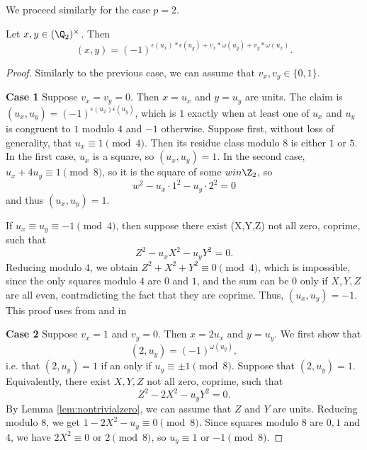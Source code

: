 We proceed similarly for the case $p = 2$.

\begin{theorem}
	\label{thm:padic_2}
	\leanok
Let $x,y \in (\Q_2)^\times$. Then
\[(x,y) = (-1)^{\epsilon(u_x)*\epsilon(u_y) + v_x * \omega(u_y) + v_y * \omega(u_x)}.\]
\end{theorem}

\begin{proof}
	Similarly to the previous case, we can assume that $v_x, v_y \in \{0, 1\}$.

	\noindent\textbf{Case 1} Suppose $v_x=v_y=0$. Then $x=u_x$ and $y=u_y$ are units. The claim is
		$(u_x,u_y)=(-1)^{\epsilon(u_x)\epsilon(u_y)}$, which is $1$ exactly when at least one of $u_x$
		and $u_y$ is congruent to $1$ modulo $4$ and $-1$ otherwise.
		Suppose first, without loss of generality, that $u_x \equiv 1 \pmod 4$. Then its residue class
		modulo $8$ is either $1$ or $5$. In the first case, $u_x$ is a square, so $(u_x,u_y)=1$. In the
		second case, $u_x+4u_y \equiv 1 \pmod 8$, so it is the square of some $w in \Z_2$, so
		\[
		w^2-u_x\cdot 1^2- u_y\cdot 2^2 = 0
		\]
		and thus $(u_x,u_y)=1$.

		If $u_x \equiv u_y \equiv -1 \pmod 4$, then suppose there exist (X,Y,Z) not all zero, coprime,
		such that
		\[
		Z^2-u_xX^2-u_yY^2=0.
		\]
		Reducing modulo $4$, we obtain $Z^2+X^2+Y^2 \equiv 0 \pmod 4$, which is impossible, since the
		only squares modulo $4$ are $0$ and $1$, and the sum can be $0$ only if $X,Y,Z$ are all even,
		contradicting the fact that they are coprime. Thus, $(u_x,u_y)=-1$.
		This proof uses  from  and  in 

		\noindent\textbf{Case 2} Suppose $v_x=1$ and $v_y=0$. Then $x=2 u_x$ and $y=u_y$. We first show that
		\[
		(2, u_y) = (-1)^{\omega(u_y)},
		\]
		i.e. that $(2, u_y)=1$ if an only if $u_y \equiv \pm 1 \pmod 8$.
		Suppose that $(2, u_y)=1$. Equivalently, there exist $X,Y,Z$ not all zero, coprime, such that
		\[
		Z^2-2X^2-u_yY^2=0.
		\]
		By Lemma \ref{lem:nontrivialzero}, we can assume that $Z$ and $Y$ are units.
		Reducing modulo $8$, we get $1 - 2X^2 - u_y \equiv 0 \pmod 8$. Since squares modulo $8$ are
		$0, 1$ and $4$, we have $2X^2 \equiv 0$ or $2 \pmod 8$, so $u_y \equiv 1$ or $-1 \pmod 8$.


\end{proof}
